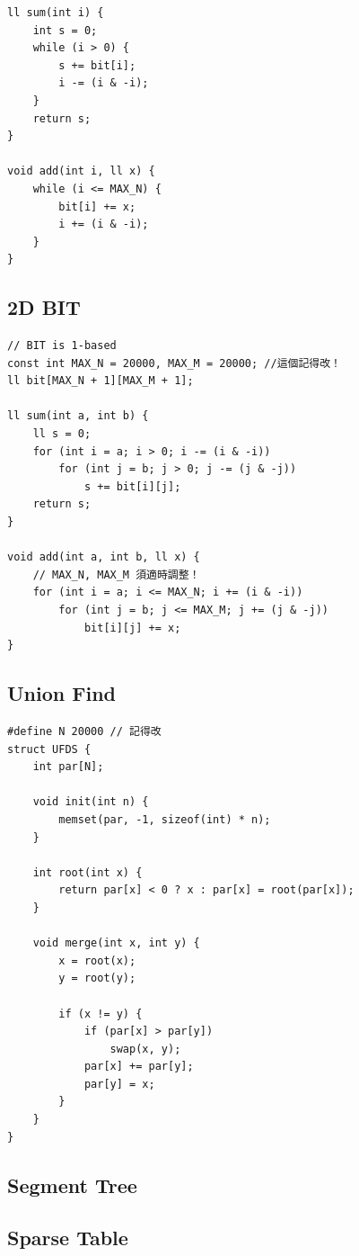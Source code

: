 \documentclass[10pt,oneside]{article}
\begin{document}
\begin{landscape}
\begin{multicols}{2}
\begin{verbatim}
ll sum(int i) {
    int s = 0;
    while (i > 0) {
        s += bit[i];
        i -= (i & -i);
    }
    return s;
}

void add(int i, ll x) {
    while (i <= MAX_N) {
        bit[i] += x;
        i += (i & -i);
    }
}
\end{verbatim}

\subsection{2D BIT}

\begin{verbatim}
// BIT is 1-based
const int MAX_N = 20000, MAX_M = 20000; //這個記得改！
ll bit[MAX_N + 1][MAX_M + 1];

ll sum(int a, int b) {
    ll s = 0;
    for (int i = a; i > 0; i -= (i & -i))
        for (int j = b; j > 0; j -= (j & -j))
            s += bit[i][j];
    return s;
}

void add(int a, int b, ll x) {
	// MAX_N, MAX_M 須適時調整！
    for (int i = a; i <= MAX_N; i += (i & -i))
        for (int j = b; j <= MAX_M; j += (j & -j))
            bit[i][j] += x;
}
\end{verbatim}

\subsection{Union Find}

\begin{verbatim}
#define N 20000 // 記得改
struct UFDS {
    int par[N];

    void init(int n) {
        memset(par, -1, sizeof(int) * n);
    }

    int root(int x) {
        return par[x] < 0 ? x : par[x] = root(par[x]);
    }

    void merge(int x, int y) {
        x = root(x);
        y = root(y);

        if (x != y) {
            if (par[x] > par[y])
                swap(x, y);
            par[x] += par[y];
            par[y] = x;
        }
    }
}
\end{verbatim}

\subsection{Segment Tree}

\subsection{Sparse Table}


\end{multicols}
\end{landscape}
\end{document}
